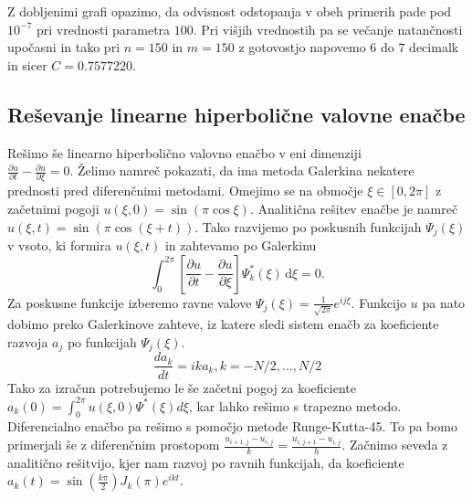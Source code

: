 \documentclass{article}
\begin{document}
Z dobljenimi grafi opazimo, da odvisnost odstopanja v obeh primerih pade pod $10^{-7}$ pri vrednosti parametra $100$. Pri višjih vrednostih pa se večanje natančnosti upočasni in tako pri $n=150$ in $m=150$ z gotovostjo napovemo $6$ do $7$ decimalk in sicer $C=0.7577220$.
\subsection{Reševanje linearne hiperbolične valovne enačbe}
Rešimo še linearno hiperbolično valovno enačbo v eni dimenziji \\$\frac{\partial u}{\partial t} - \frac{\partial u}{\partial \xi} = 0$. Želimo namreč pokazati, da ima metoda Galerkina nekatere prednosti pred diferenčnimi metodami. Omejimo se na območje $\xi \in [0, 2\pi]$ z začetnimi pogoji $u(\xi, 0) = \sin{(\pi \cos{\xi})}$. Analitična rešitev enačbe je namreč $u(\xi, t)=\sin{(\pi \cos{(\xi + t)})}$. Tako razvijemo po poskusnih funkcijah $\Psi_j(\xi)$ v vsoto, ki formira $u(\xi, t)$ in zahtevamo po Galerkinu 
\begin{equation}
	\int_0^{2\pi} \left[ \frac{\partial u}{\partial t} - \frac{\partial u}{\partial \xi} \right] \Psi_k^*(\xi) \, \mathrm{d}\xi = 0.
\end{equation}
Za poskusne funkcije izberemo ravne valove $\Psi_j(\xi)=\frac{1}{\sqrt{2\pi}}e^{ij\xi}$. Funkcijo $u$ pa nato dobimo preko Galerkinove zahteve, iz katere sledi sistem enačb za koeficiente razvoja $a_j$ po funkcijah $\Psi_j(\xi)$. 
\begin{equation}
	\frac{da_k}{dt}=ika_k, k=-N/2,...,N/2
\end{equation}
Tako za izračun potrebujemo le še začetni pogoj za koeficiente $a_k(0)=\int_0^{2\pi}u(\xi, 0)\Psi^*(\xi)d\xi$, kar lahko rešimo s trapezno metodo. Diferencialno enačbo pa rešimo s pomočjo metode Runge-Kutta-45. To pa bomo primerjali še z diferenčnim prostopom $\frac{u_{i+1,j}-u_{i, j}}{k} = \frac{u_{i, j+1} - u_{i, j}}{h}$.
\newpage
Začnimo seveda z analitično rešitvijo, kjer nam razvoj po ravnih funkcijah, da koeficiente $a_k(t) = \sin{(\frac{k\pi}{2})J_k(\pi)e^{ikt}}$.
\end{document}
